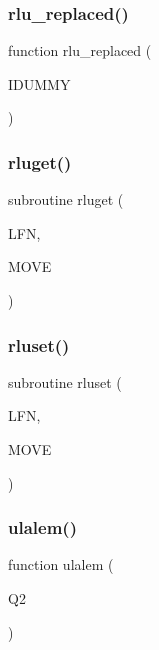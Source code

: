 \subsubsection{\texorpdfstring{rlu\+\_\+replaced()}{rlu\_replaced()}}
{\footnotesize\ttfamily function rlu\+\_\+replaced (\begin{DoxyParamCaption}\item[{}]{I\+D\+U\+M\+MY }\end{DoxyParamCaption})}

\mbox{\label{jetset7409_8f_aea3b04f21086e3eea89983ad08de76ac}} 
\subsubsection{\texorpdfstring{rluget()}{rluget()}}
{\footnotesize\ttfamily subroutine rluget (\begin{DoxyParamCaption}\item[{}]{L\+FN,  }\item[{}]{M\+O\+VE }\end{DoxyParamCaption})}

\mbox{\label{jetset7409_8f_aae19dd29cb0444e2034b7e94409bb8ed}} 
\subsubsection{\texorpdfstring{rluset()}{rluset()}}
{\footnotesize\ttfamily subroutine rluset (\begin{DoxyParamCaption}\item[{}]{L\+FN,  }\item[{}]{M\+O\+VE }\end{DoxyParamCaption})}

\mbox{\label{jetset7409_8f_a59f4ea713816e8bcd665aef916e6bad7}} 
\subsubsection{\texorpdfstring{ulalem()}{ulalem()}}
{\footnotesize\ttfamily function ulalem (\begin{DoxyParamCaption}\item[{}]{Q2 }\end{DoxyParamCaption})}

